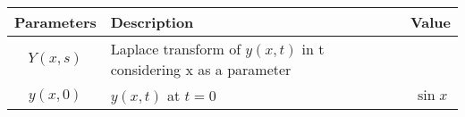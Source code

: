 \begin{tabular}{|c|p{3cm}|c|}
\hline
\textbf{Parameters} & \textbf{Description} & \textbf{Value} \\
\hline
$Y(x,s)$ & Laplace transform of $y(x,t)$ in t considering x as a parameter & \\
\hline
$y(x,0)$& $y(x,t)$ at $t=0$ & $\sin{x}$ \\
\hline
\end{tabular}
